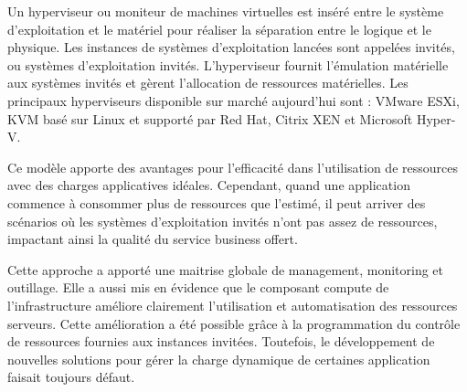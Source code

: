 Un hyperviseur ou moniteur de machines virtuelles est inséré entre le système d'exploitation et le matériel pour réaliser la séparation entre le logique et le physique. Les instances de systèmes d'exploitation lancées sont appelées invités, ou systèmes d'exploitation invités. L'hyperviseur fournit l'émulation matérielle aux systèmes invités et gèrent l'allocation de ressources matérielles.  Les principaux hyperviseurs disponible sur marché aujourd'hui sont : VMware ESXi, KVM basé sur Linux et supporté par Red Hat, Citrix XEN et Microsoft Hyper-V. 

Ce modèle apporte des avantages pour l'efficacité dans l'utilisation de ressources avec des charges applicatives idéales.
 Cependant, quand une application commence à consommer plus de ressources que l'estimé, il peut arriver des scénarios où les systèmes d'exploitation invités n'ont pas assez de ressources, impactant ainsi la qualité du service business offert. 

Cette approche a apporté une maitrise globale de management, monitoring et outillage. Elle a aussi mis en évidence que le composant \og compute \fg{} de l'infrastructure améliore clairement l'utilisation et automatisation des ressources serveurs. Cette amélioration a été possible grâce à la programmation du contrôle de ressources fournies aux instances invitées. Toutefois, le développement de nouvelles solutions pour gérer la charge dynamique de certaines application faisait toujours défaut. \cite{ibmPlanningVirtCCchap2}\cite{journeySDDC}




